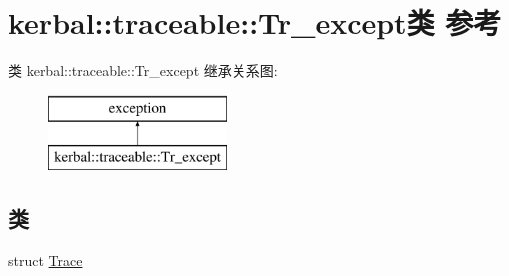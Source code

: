 \hypertarget{classkerbal_1_1traceable_1_1_tr__except}{}\section{kerbal\+:\+:traceable\+:\+:Tr\+\_\+except类 参考}
\label{classkerbal_1_1traceable_1_1_tr__except}
类 kerbal\+:\+:traceable\+:\+:Tr\+\_\+except 继承关系图\+:\begin{figure}[H]
\begin{center}
\leavevmode
\includegraphics[height=2.000000cm]{classkerbal_1_1traceable_1_1_tr__except}
\end{center}
\end{figure}
\subsection*{类}
\begin{DoxyCompactItemize}
\item 
struct \hyperlink{structkerbal_1_1traceable_1_1_tr__except_1_1_trace}{Trace}
\end{DoxyCompactItemize}
